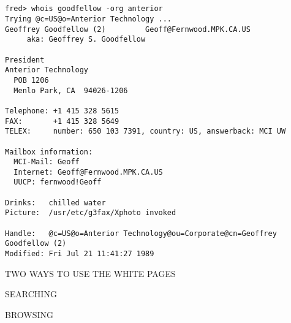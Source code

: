\begin{bwslide}

\smaller
\begin{verbatim}


fred> whois goodfellow -org anterior
Trying @c=US@o=Anterior Technology ...
Geoffrey Goodfellow (2)         Geoff@Fernwood.MPK.CA.US
     aka: Geoffrey S. Goodfellow

President
Anterior Technology
  POB 1206
  Menlo Park, CA  94026-1206

Telephone: +1 415 328 5615
FAX:       +1 415 328 5649
TELEX:     number: 650 103 7391, country: US, answerback: MCI UW

Mailbox information:
  MCI-Mail: Geoff
  Internet: Geoff@Fernwood.MPK.CA.US
  UUCP: fernwood!Geoff

Drinks:   chilled water
Picture:  /usr/etc/g3fax/Xphoto invoked

Handle:   @c=US@o=Anterior Technology@ou=Corporate@cn=Geoffrey Goodfellow (2)
Modified: Fri Jul 21 11:41:27 1989
\end{verbatim}
\end{bwslide}




\begin{bwslide}

\begin{nrtc}
\item	TWO WAYS TO USE THE WHITE PAGES
    \begin{nrtc}
    \item	SEARCHING

    \item	BROWSING
    \end{nrtc}
\end{nrtc}
\end{bwslide}




